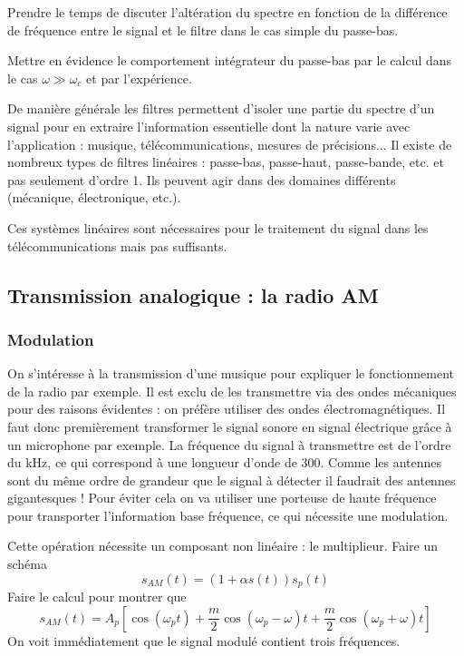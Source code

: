 \begin{remarque}
Prendre le temps de discuter l'altération du spectre en fonction de la différence de fréquence entre le signal et le filtre dans le cas simple du passe-bas.
\end{remarque}

Mettre en évidence le comportement intégrateur du passe-bas par le calcul dans le cas $\omega\gg\omega_c$ et par l'expérience.

De manière générale les filtres permettent d'isoler une partie du spectre d'un signal pour en extraire l'information essentielle dont la nature varie avec l'application : musique, télécommunications, mesures de précisions...
Il existe de nombreux types de filtres linéaires : passe-bas, passe-haut, passe-bande, etc. et pas seulement d'ordre 1.
Ils peuvent agir dans des domaines différents (mécanique, électronique, etc.).

\begin{transition}
Ces systèmes linéaires sont nécessaires pour le traitement du signal dans les télécommunications mais pas suffisants.
\end{transition}

\subsection{Transmission analogique : la radio AM}

\subsubsection{Modulation}

On s'intéresse à la transmission d'une musique pour expliquer le fonctionnement de la radio par exemple.
Il est exclu de les transmettre via des ondes mécaniques pour des raisons évidentes : on préfère utiliser des ondes électromagnétiques.
Il faut donc premièrement transformer le signal sonore en signal électrique grâce à un microphone par exemple.
La fréquence du signal à transmettre est de l'ordre du kHz, ce qui correspond à une longueur d'onde de \unit{300}{\kilo\meter}.
Comme les antennes sont du même ordre de grandeur que le signal à détecter il faudrait des antennes gigantesques !
Pour éviter cela on va utiliser une porteuse de haute fréquence pour transporter l'information base fréquence, ce qui nécessite une modulation.

Cette opération nécessite un composant non linéaire : le multiplieur.
Faire un schéma
\begin{equation}
s_{AM}(t) = (1+\alpha s(t))s_p(t)
\end{equation}
Faire le calcul pour montrer que 
\begin{equation}
s_{AM}(t) = A_p \left[ \cos(\omega_p t) + \frac{m}{2}\cos(\omega_p-\omega)t + \frac{m}{2}\cos(\omega_p+\omega)t \right] 
\end{equation}
On voit immédiatement que le signal modulé contient trois fréquences.

